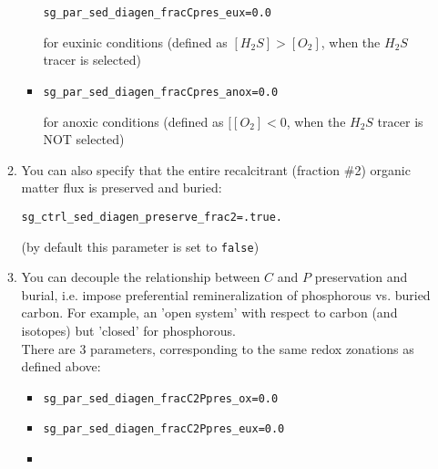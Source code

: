 \begin{enumerate}
\begin{enumerate}
\begin{itemize}[noitemsep]
\begin{verbatim}
sg_par_sed_diagen_fracCpres_eux=0.0
\end{verbatim}\normalsize\vspace{-0mm}
for euxinic conditions (defined as \([H_{2}S]>[O_{2}]\), when the \(H_{2}S\) tracer is selected)
\vspace{1mm}
\item 
\vspace{-0mm}\small\begin{verbatim}
sg_par_sed_diagen_fracCpres_anox=0.0
\end{verbatim}\normalsize\vspace{-0mm}
for anoxic conditions (defined as \([[O_{2}]<0\), when the \(H_{2}S\) tracer is NOT selected)
\end{itemize}
\vspace{1mm}
\item You can also specify that the entire recalcitrant (fraction \#2) organic matter flux is preserved and buried:
\vspace{-0mm}\small\begin{verbatim}
sg_ctrl_sed_diagen_preserve_frac2=.true.
\end{verbatim}\normalsize\vspace{-0mm}
(by default this parameter is set to \texttt{false})
\vspace{1mm}
\item You can decouple the relationship between \(C\) and \(P\) preservation and burial, i.e. impose preferential remineralization of phosphorous vs. buried carbon. For example, an 'open system' with respect to carbon (and isotopes) but 'closed' for phosphorous.
\\There are 3 parameters, corresponding to the same redox zonations as defined above: 
\vspace{1mm}
\begin{itemize}[noitemsep]
\item 
\vspace{-0mm}\small\begin{verbatim}
sg_par_sed_diagen_fracC2Ppres_ox=0.0
\end{verbatim}\normalsize\vspace{-0mm}
\item 
\vspace{-0mm}\small\begin{verbatim}
sg_par_sed_diagen_fracC2Ppres_eux=0.0
\end{verbatim}\normalsize\vspace{-0mm}
\item 
\vspace{-0mm}\small\begin{verbatim}

\end{verbatim}
\end{itemize}
\end{enumerate}
\end{enumerate}
